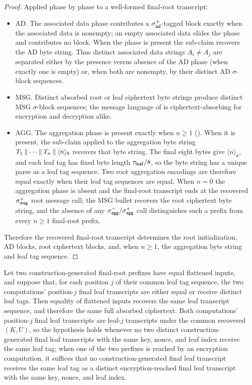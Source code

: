 \begin{proof}
Applied phase by phase to a well-formed final-root transcript:
\begin{itemize}
\item AD. The associated data phase contributes a $\sigma_{\mathsf{ad}}^+$-tagged
  block exactly when the associated data is nonempty; an empty
  associated data elides the phase and contributes no block. When the
  phase is present the sub-claim recovers the AD byte string. Thus
  distinct associated data strings $A_i \neq A_j$ are separated either
  by the presence versus absence of the AD phase (when exactly one is
  empty) or, when both are nonempty, by their distinct AD
  $\sigma$-block sequences.
\item MSG. Distinct absorbed root or leaf ciphertext byte strings
  produce distinct MSG $\sigma$-block sequences; the message language of
   is ciphertext-absorbing for encryption and
  decryption alike.
\item AGG. The aggregation phase is present exactly when $n \geq 1$
  (). When it is present, the sub-claim applied to the
  aggregation byte string $T_1 \mathbin{\|} \cdots \mathbin{\|} T_n \mathbin{\|}
  \langle n \rangle_8$ recovers that byte string. The final eight bytes
  give $\langle n \rangle_8$, and each leaf tag has fixed byte length
  $\tau_{\mathsf{leaf}} / 8$, so the byte string has a unique parse as a leaf tag
  sequence. Two root aggregation encodings are therefore equal exactly
  when their leaf tag sequences are equal. When
  $n = 0$ the aggregation phase is absent and the final-root transcript
  ends at the recovered $\sigma_{\mathsf{msg}}^+$ root message call; the MSG bullet
  recovers the root ciphertext byte string, and the absence of any
  $\sigma_{\mathsf{agg}}^-/\sigma_{\mathsf{agg}}^+$ call distinguishes such a prefix from every
  $n \geq 1$ final-root prefix.
\end{itemize}

Therefore the recovered final-root transcript determines the root
initialization, AD blocks, root ciphertext blocks, and, when
$n \geq 1$, the aggregation byte string and leaf tag sequence.
\end{proof}

\begin{lemma}
\label{lem:leaf-recovery}
Let two construction-generated final-root prefixes have equal flattened
inputs, and suppose that, for each position $j$ of their common leaf tag
sequence, the two computations' position-$j$ final leaf transcripts are
either equal or receive distinct leaf tags. Then equality of flattened
inputs recovers the same leaf transcript sequence, and therefore the
same full absorbed ciphertext. Both computations' position-$j$ final
leaf transcripts are leaf-$j$ transcripts under the common recovered
$(K, U)$, so the hypothesis holds whenever no two distinct
construction-generated final leaf transcripts with the same key, nonce,
and leaf index receive the same leaf tag; when one of the two prefixes
is reached by an encryption computation, it suffices that no
construction-generated final leaf transcript receives the same leaf tag
as a distinct encryption-reached final leaf transcript with the same
key, nonce, and leaf index.
\end{lemma}

